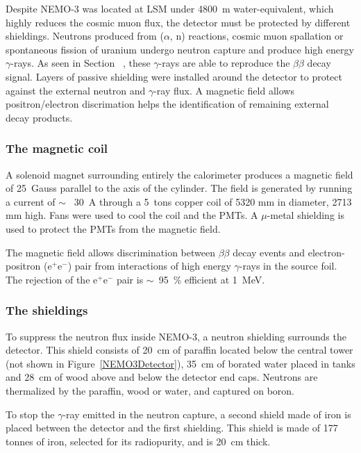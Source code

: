 \documentclass[main.tex]{subfiles}
\begin{document}
\NI Despite NEMO-3 was located at LSM under 4800~m water-equivalent, which highly reduces the cosmic muon flux, the detector must be protected by different shieldings. Neutrons produced from ($\alpha$, n) reactions, cosmic muon spallation or spontaneous fission of uranium undergo neutron capture and produce high energy $\gamma$-rays. As seen in Section~ , these $\gamma$-rays are able to reproduce the $\beta\beta$ decay signal. Layers of passive shielding were installed around the detector to protect against the external neutron and $\gamma$-ray flux. A magnetic field allows positron/electron discrimation helps the identification of remaining external decay products.


\subsubsection{The magnetic coil}


\NI A solenoid magnet surrounding entirely the calorimeter produces a magnetic field of 25~Gauss parallel to the axis of the cylinder. The field is generated by running a current of $\sim$~ 30~A through a 5~tons copper coil of 5320 mm in diameter, 2713 mm high. Fans were used to cool the coil and the PMTs. A $\mu$-metal shielding is used to protect the PMTs from the magnetic field. 


\bigskip


\NI The magnetic field allows discrimination between $\beta\beta$ decay events and electron-positron (e$^+$e$^-$) pair from interactions of high energy $\gamma$-rays in the source foil. The rejection of the e$^+$e$^-$ pair is $\sim$~95~\% efficient at 1~MeV. 

\bigskip


\subsubsection{The shieldings}


\NI To suppress the neutron flux inside NEMO-3, a neutron shielding surrounds the detector. This shield consists of 20~cm of paraffin located below the central tower (not shown in Figure~\ref{NEMO3Detector}), 35~cm of borated water placed in tanks and 28~cm of wood above and below the detector end caps. Neutrons are thermalized by the paraffin, wood or water, and captured on boron. 


\bigskip

\NI To stop the $\gamma$-ray emitted in the neutron capture, a second shield made of iron is placed between the detector and the first shielding. This shield is made of 177 tonnes of iron, selected for its radiopurity, and is 20~cm thick.
\end{document}
